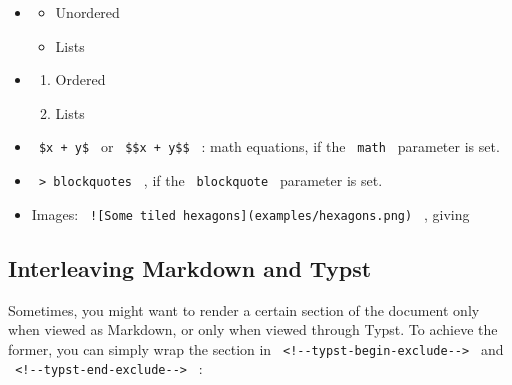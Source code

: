 \begin{itemize}
\item
\begin{Shaded}
\begin{Highlighting}[]
\SpecialStringTok{{-} }
\SpecialStringTok{{-} }
\end{Highlighting}
\end{Shaded}

  \begin{itemize}
  \tightlist
  \item
    Unordered
  \item
    Lists
  \end{itemize}
\item
\begin{Shaded}
\begin{Highlighting}[]
\end{Highlighting}
\end{Shaded}

  \begin{enumerate}
  \tightlist
  \item
    Ordered
  \item
    Lists
  \end{enumerate}
\item
  \texttt{\ \$x\ +\ y\$\ } or \texttt{\ \$\$x\ +\ y\$\$\ } : math
  equations, if the \texttt{\ math\ } parameter is set.
\item
  \texttt{\ \textgreater{}\ blockquotes\ } , if the
  \texttt{\ blockquote\ } parameter is set.
\item
  Images:
  \texttt{\ !{[}Some\ tiled\ hexagons{]}(examples/hexagons.png)\ } ,
  giving
\end{itemize}

\subsection{Interleaving Markdown and
Typst}\label{interleaving-markdown-and-typst}

Sometimes, you might want to render a certain section of the document
only when viewed as Markdown, or only when viewed through Typst. To
achieve the former, you can simply wrap the section in
\texttt{\ \textless{}!-\/-typst-begin-exclude-\/-\textgreater{}\ } and
\texttt{\ \textless{}!-\/-typst-end-exclude-\/-\textgreater{}\ } :

